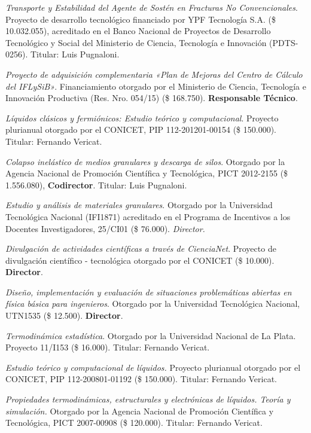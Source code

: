 \begin{timeline}
 \textit{Transporte y Estabilidad del Agente de Sostén en Fracturas No Convencionales}. Proyecto de desarrollo tecnológico financiado por YPF Tecnología S.A. (\$ 10.032.055), acreditado en el Banco Nacional de Proyectos de Desarrollo Tecnológico y Social del Ministerio de Ciencia, Tecnología e Innovación (PDTS-0256). Titular: Luis Pugnaloni.

 \textit{Proyecto de adquisición complementaria «Plan de Mejoras del Centro de Cálculo del IFLySiB»}. Financiamiento otorgado por el Ministerio de Ciencia, Tecnología e Innovación Productiva (Res. Nro. 054/15) (\$ 168.750). \textbf{Responsable Técnico}.

  \textit{Líquidos clásicos y fermiónicos: Estudio teórico y computacional}. Proyecto plurianual otorgado por el CONICET, PIP 112-201201-00154 (\$ 150.000). Titular: Fernando Vericat.

 \textit{Colapso inelástico de medios granulares y descarga de silos}. Otorgado por la Agencia Nacional de Promoción Científica y Tecnológica, PICT 2012-2155 (\$ 1.556.080), \textbf{Codirector}. Titular: Luis Pugnaloni.

 \textit{Estudio y análisis de materiales granulares}. Otorgado por la Universidad Tecnológica Nacional (IFI1871) acreditado en el Programa de Incentivos a los Docentes Investigadores, 25/CI01 (\$ 76.000). \textit{Director.}

 \textit{Divulgación de actividades científicas a través de CienciaNet}. Proyecto de divulgación científico - tecnológica otorgado por el CONICET (\$ 10.000). \textbf{Director}.

 \textit{Diseño, implementación y evaluación de situaciones problemáticas abiertas en física básica para ingenieros}. Otorgado por la Universidad Tecnológica Nacional, UTN1535 (\$ 12.500). \textbf{Director}.

 \textit{Termodinámica estadística}. Otorgado por la Universidad Nacional de La Plata. Proyecto 11/I153 (\$ 16.000). Titular: Fernando Vericat.

 \textit{Estudio teórico y computacional de líquidos.} Proyecto plurianual otorgado por el CONICET, PIP  112-200801-01192 (\$ 150.000). Titular: Fernando Vericat.

 \textit{Propiedades termodinámicas, estructurales y electrónicas de líquidos. Teoría y simulación.} Otorgado por la Agencia Nacional de Promoción Científica y Tecnológica, PICT 2007-00908 (\$ 120.000). Titular: Fernando Vericat.


\end{timeline}

